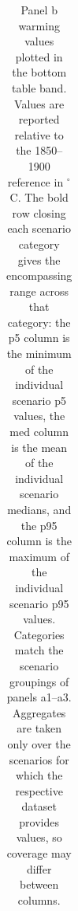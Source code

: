 \begin{table}[tp]
{\begin{tabular}{lrrrrrrrrrrrrrrr}
\bottomrule
\end{tabular}%
}
\caption{Panel b warming values plotted in the bottom table band. Values are reported relative to the 1850--1900 reference in $^{\circ}$C. The bold row closing each scenario category gives the encompassing range across that category: the p5 column is the minimum of the individual scenario p5 values, the med column is the mean of the individual scenario medians, and the p95 column is the maximum of the individual scenario p95 values. Categories match the scenario groupings of panels a1--a3. Aggregates are taken only over the scenarios for which the respective dataset provides values, so coverage may differ between columns.}
\label{tab:figure2_panel_b_values}
\end{table}
